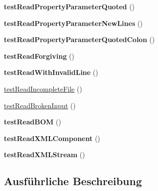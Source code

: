 \begin{DoxyCompactItemize}
{\bfseries test\+Read\+Property\+Parameter\+Quoted} ()
\item 
\mbox{\label{class_sabre_1_1_v_object_1_1_reader_test_a21a243cf6d7a042333e9de81960f9508}} 
{\bfseries test\+Read\+Property\+Parameter\+New\+Lines} ()
\item 
\mbox{\label{class_sabre_1_1_v_object_1_1_reader_test_a60469cc423a1288682ef9f118dcb06e3}} 
{\bfseries test\+Read\+Property\+Parameter\+Quoted\+Colon} ()
\item 
\mbox{\label{class_sabre_1_1_v_object_1_1_reader_test_a68d0ce0c247262313f76997dad07861c}} 
{\bfseries test\+Read\+Forgiving} ()
\item 
\mbox{\label{class_sabre_1_1_v_object_1_1_reader_test_a939b8195cbf8c16ef6fd2fc4d28a846b}} 
{\bfseries test\+Read\+With\+Invalid\+Line} ()
\item 
\mbox{\hyperlink{class_sabre_1_1_v_object_1_1_reader_test_a7d0b849aacb8f28203eeb091aa199c72}{test\+Read\+Incomplete\+File}} ()
\item 
\mbox{\hyperlink{class_sabre_1_1_v_object_1_1_reader_test_abee8a6f0a3f0f3869a1d07d1ed198ca5}{test\+Read\+Broken\+Input}} ()
\item 
\mbox{\label{class_sabre_1_1_v_object_1_1_reader_test_ad4042848b531220ca96559b7086ae118}} 
{\bfseries test\+Read\+B\+OM} ()
\item 
\mbox{\label{class_sabre_1_1_v_object_1_1_reader_test_aacb50221a0e373e01131d3e157cbabf1}} 
{\bfseries test\+Read\+X\+M\+L\+Component} ()
\item 
\mbox{\label{class_sabre_1_1_v_object_1_1_reader_test_aaed44e1c4c2049dd73db4364885db09d}} 
{\bfseries test\+Read\+X\+M\+L\+Stream} ()
\end{DoxyCompactItemize}


\subsection{Ausführliche Beschreibung}


